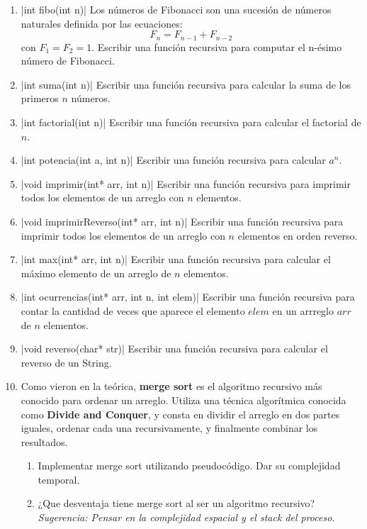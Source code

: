 \documentclass[titlepage,oneside]{book}
\begin{document}
    \begin{enumerate}
    
        \item{}|int fibo(int n)|
        Los números de Fibonacci son una sucesión de números naturales definida por las ecuaciones:
        $$F_n = F_{n-1} + F_{n-2}$$ con $F_1 = F_2 = 1$. Escribir una función recursiva para computar el n-ésimo número de Fibonacci.

         \item{}|int suma(int n)|
         Escribir una función recursiva para calcular la suma de los primeros $n$ números.

         \item{}|int factorial(int n)|
         Escribir una función recursiva para calcular el factorial de $n$.

         \item{}|int potencia(int a, int n)|
         Escribir una función recursiva para calcular $a^n$.

         \item{}|void imprimir(int* arr, int n)|
         Escribir una función recursiva para imprimir todos los elementos de un arreglo con $n$ elementos.

         \item{}|void imprimirReverso(int* arr, int n)|
         Escribir una función recursiva para imprimir todos los elementos de un arreglo con $n$ elementos en orden reverso.

         \item{}|int max(int* arr, int n)|
         Escribir una función recursiva para calcular el máximo elemento de un arreglo de $n$ elementos.

         \item{}|int ocurrencias(int* arr, int n, int elem)|
         Escribir una función recursiva para contar la cantidad de veces que aparece el elemento $elem$ en un arrreglo $arr$ de $n$ elementos.

         \item{}|void reverso(char* str)|
         Escribir una función recursiva para calcular el reverso de un String.

         

        

        \item Como vieron en la teórica, \textbf{merge sort} es el algoritmo recursivo más conocido para ordenar un arreglo. Utiliza una técnica algorítmica conocida como \textbf{Divide and Conquer}, y consta en dividir el arreglo en dos partes iguales, ordenar cada una recursivamente, y finalmente combinar los resultados.
        \begin{enumerate}
            \item Implementar merge sort utilizando pseudocódigo. Dar su complejidad temporal.
            \item ¿Que desventaja tiene merge sort al ser un algoritmo recursivo? \newline\textit{Sugerencia: Pensar en la complejidad espacial y el stack del proceso.}
        \end{enumerate}


\end{enumerate}
\end{document}
